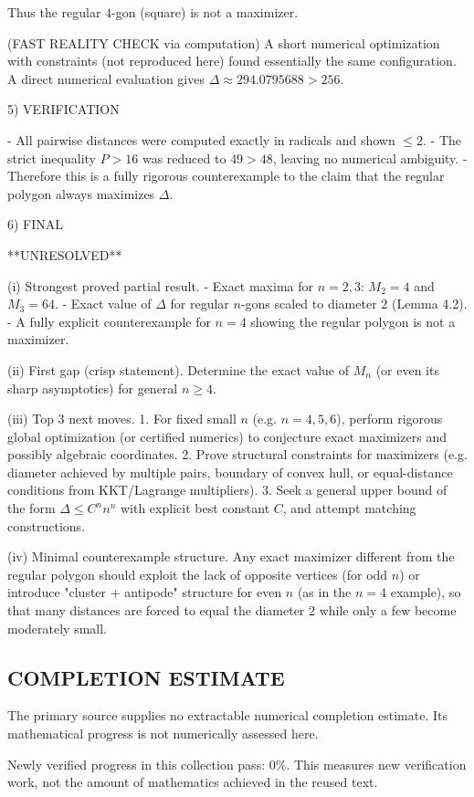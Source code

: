 Thus the regular $4$-gon (square) is not a maximizer.

(FAST REALITY CHECK via computation)
A short numerical optimization with constraints (not reproduced here) found essentially the same
configuration. A direct numerical evaluation gives $\Delta\approx 294.0795688>256$.

5) VERIFICATION

- All pairwise distances were computed exactly in radicals and shown $\le 2$.
- The strict inequality $P>16$ was reduced to $49>48$, leaving no numerical ambiguity.
- Therefore this is a fully rigorous counterexample to the claim that the regular polygon always
  maximizes $\Delta$.

6) FINAL

**UNRESOLVED**

(i) Strongest proved partial result.
- Exact maxima for $n=2,3$: $M_2=4$ and $M_3=64$.
- Exact value of $\Delta$ for regular $n$-gons scaled to diameter $2$ (Lemma 4.2).
- A fully explicit counterexample for $n=4$ showing the regular polygon is not a maximizer.

(ii) First gap (crisp statement).
Determine the exact value of $M_n$ (or even its sharp asymptotics) for general $n\ge 4$.

(iii) Top 3 next moves.
1. For fixed small $n$ (e.g. $n=4,5,6$), perform rigorous global optimization (or certified numerics)
   to conjecture exact maximizers and possibly algebraic coordinates.
2. Prove structural constraints for maximizers (e.g. diameter achieved by multiple pairs, boundary
   of convex hull, or equal-distance conditions from KKT/Lagrange multipliers).
3. Seek a general upper bound of the form $\Delta\le C^n n^n$ with explicit best constant $C$, and
   attempt matching constructions.

(iv) Minimal counterexample structure.
Any exact maximizer different from the regular polygon should exploit the lack of opposite vertices
(for odd $n$) or introduce "cluster + antipode" structure for even $n$ (as in the $n=4$ example),
so that many distances are forced to equal the diameter $2$ while only a few become moderately small.




\subsection*{COMPLETION ESTIMATE}
The primary source supplies no extractable numerical completion estimate. Its mathematical progress is not numerically assessed here.

Newly verified progress in this collection pass: $0\%$. This measures new verification work, not the amount of mathematics achieved in the reused text.
